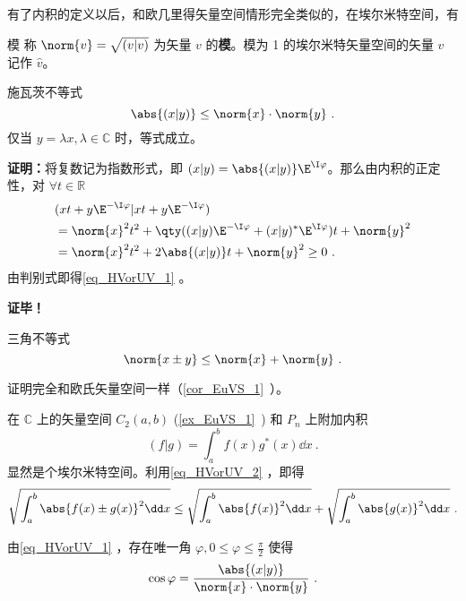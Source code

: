 有了内积的定义以后，和欧几里得矢量空间情形完全类似的，在埃尔米特空间，有
\begin{definition}{模}
称 $\norm{  v}=\sqrt{(  v|  v)}$ 为矢量 $  v$ 的\textbf{模}。模为 1 的埃尔米特矢量空间的矢量 $v$ 记作 $\hat{v}$。
\end{definition} 
\begin{theorem}{施瓦茨不等式}
\begin{equation}\label{eq_HVorUV_1}
\abs{(  x|  y)}\leq \norm{  x}\cdot \norm{  y}~.
\end{equation}
仅当 $  y=\lambda  x,\lambda\in\mathbb{C}$ 时，等式成立。
\end{theorem}
\textbf{证明：}将复数记为指数形式，即 $(  x|  y)=\abs{(  x|  y)}\E^{\I \varphi}$。那么由内积的正定性，对 $\forall t\in\mathbb{R}$
\begin{equation}
\begin{aligned}
&(  x t+  y\E^{-\I\varphi}|  x t+  y\E^{-\I\varphi})\\
&=\norm{  x}^2t^2+\qty((  x|  y)\E^{-\I\varphi}+(  x|  y)^*\E^{\I\varphi})t+\norm{  y}^2\\
&=\norm{  x}^2t^2+2\abs{(  x|  y)}t+\norm{  y}^2\geq0~.
\end{aligned}
\end{equation}
由判别式即得\autoref{eq_HVorUV_1} 。

\textbf{证毕！}
\begin{corollary}{三角不等式}
\begin{equation}\label{eq_HVorUV_2}
\norm{  x\pm  y}\leq\norm{  x}+\norm{  y}~.
\end{equation}
\end{corollary}
证明完全和欧氏矢量空间一样（\autoref{cor_EuVS_1}~）。
\begin{example}{}\label{ex_HVorUV_1}
在 $\mathbb{C}$ 上的矢量空间 $C_2(a,b)$ (\autoref{ex_EuVS_1}~) 和 $P_n$ 上附加内积
\begin{equation}
(f|g)=\int_a^{b}f(x)g^*(x)\dd x~.
\end{equation}
显然是个埃尔米特空间。利用\autoref{eq_HVorUV_2} ，即得
\begin{equation}
\sqrt{\int_a^b\abs{f(x)\pm g(x)}^2\dd x}\leq\sqrt{\int_a^b\abs{f(x)}^2\dd x}+\sqrt{\int_a^b\abs{g(x)}^2\dd x}~.
\end{equation}
\end{example}
由\autoref{eq_HVorUV_1} ，存在唯一角 $\varphi,0\leq\varphi\leq\frac{\pi}{2}$ 使得
\begin{equation}
\cos\varphi=\frac{\abs{(  x|  y)}}{\norm{  x}\cdot \norm{  y}}~.
\end{equation}

